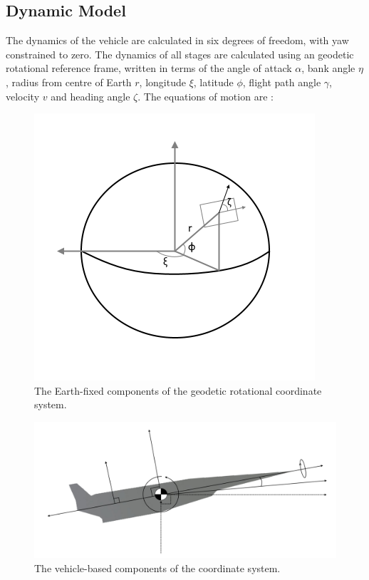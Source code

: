 \subsection{Dynamic Model}


The dynamics of the vehicle are calculated in six degrees of freedom, with yaw constrained to zero. 
The dynamics of all stages are calculated using an geodetic rotational reference frame, written in terms of the angle of attack $\alpha$, bank angle $\eta$, radius from centre of Earth $r$, longitude $\xi$, latitude $\phi$, flight path angle $\gamma$, velocity $v$ and heading angle $\zeta$. The equations of motion are \cite{Josselyn2002a}:
\begin{figure}[ht]
\centering
\includegraphics[width=0.7\linewidth]{figures/4_LODESTAR/global}
\caption{The Earth-fixed components of the geodetic rotational coordinate system.}
\label{fig:global}
\end{figure}
\begin{figure}[ht]
\centering
\includegraphics[width=0.9\linewidth]{figures/4_LODESTAR/Axes}
\caption{The vehicle-based components of the coordinate system.}
\label{fig:Axes}
\end{figure}


